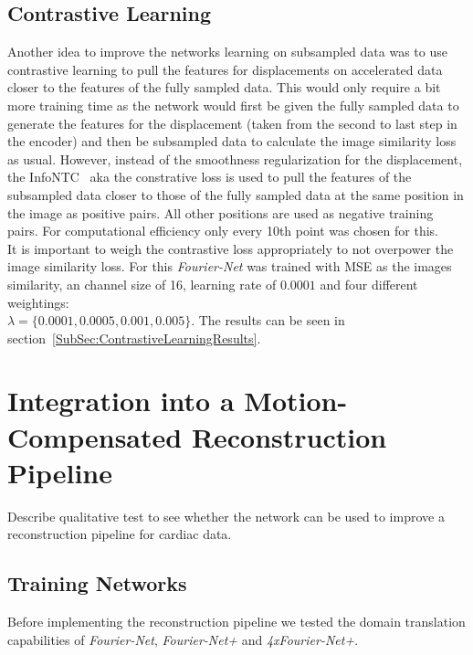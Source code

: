 \documentclass[english,version-2022-01]{uzl-thesis} %
\begin{document}
\subsection{Contrastive Learning} \label{SubSec:ContrastiveLearning}
Another idea to improve the networks learning on subsampled data was to use contrastive learning to pull the features for displacements on accelerated data closer to the features of the fully sampled data. This would only require a bit more training time as the network would first be given the fully sampled data to generate the features for the displacement (taken from the second to last step in the encoder) and then be subsampled data to calculate the image similarity loss as usual. However, instead of the smoothness regularization for the displacement, the InfoNTC~\cite{InfoNCE} aka the constrative loss is used to pull the features of the subsampled data closer to those of the fully sampled data at the same position in the image as positive pairs. All other positions are used as negative training pairs. For computational efficiency only every 10th point was chosen for this.\\
It is important to weigh the contrastive loss appropriately to not overpower the image similarity loss. For this \emph{Fourier-Net} was trained with MSE as the images similarity, an channel size of 16, learning rate of $0.0001$ and four different weightings: \\
$\lambda = \{0.0001, 0.0005, 0.001, 0.005\}$. The results can be seen in section~\ref{SubSec:ContrastiveLearningResults}.

\section{Integration into a Motion-Compensated Reconstruction Pipeline} \label{Sec:IntegrationMotion-CompensatedReconstructionPipeline}
Describe qualitative test to see whether the network can be used to improve a reconstruction pipeline for cardiac data.

\subsection{Training Networks}
Before implementing the reconstruction pipeline we tested the domain translation capabilities of \emph{Fourier-Net}, \emph{Fourier-Net+} and \emph{4xFourier-Net+}.
\end{document}
